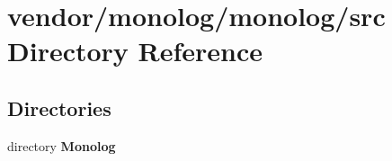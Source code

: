 \section{vendor/monolog/monolog/src Directory Reference}
\label{dir_255ce2503e4bebbe37f049d043cbe9a9}
\subsection*{Directories}
\begin{DoxyCompactItemize}
\item 
directory {\bf Monolog}
\end{DoxyCompactItemize}
